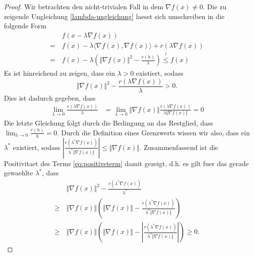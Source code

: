 \begin{proof}
Wir betrachten den nicht-trivialen Fall in dem $\nabla f(x) \neq 0$. 
Die zu zeigende Ungleichung \eqref{lambda-ungleichung} laesst sich umschreiben in die folgende Form
\begin{align*}
&f(x - \lambda \nabla f(x))\\
 = \, &f(x) - \lambda \langle \nabla f(x), \nabla f(x)\rangle + r(\lambda \nabla f(x)) \\
= \, &f(x) - \lambda( \Vert\nabla f(x)\Vert^2 - \frac{r(h)}{\lambda}) \overset{!}{\leq} f(x)
\end{align*}
Es ist hinreichend zu zeigen, dass ein $\lambda>0$ existiert, sodass
\begin{equation}
\label{eq:positiveterm}
\Vert\nabla f(x)\Vert^2 - \frac{r(\lambda \nabla f(x))}{\lambda} >0.
\end{equation}
  Dies ist dadurch gegeben, dass 
\begin{align*}
\lim_{\lambda\to 0} \frac{r(\lambda \nabla f(x))}{\lambda} &= \lim_{\lambda \to 0}\Vert\nabla f(x)\Vert \frac{r(\lambda \nabla f(x))}{\lambda \Vert\nabla f(x)\Vert}= 0
\end{align*}
Die letzte Gleichung folgt durch die Bedingung an das Restglied, dass $\lim_{h\to 0}\frac{r(h)}{h} = 0$. Durch die Definition eines Grenzwerts wissen wir also, dass ein $\lambda^*$ existiert, sodass $\left| \frac{r(\lambda^* \nabla f(x))}{\lambda^* \Vert\nabla f(x)\Vert} \right| \leq \Vert\nabla f(x)\Vert$. Zusammenfassend ist die Positivitaet des Terms \eqref{eq:positiveterm} damit gezeigt, d.h. es gilt fuer das gerade gewaehlte $\lambda^*$, dass
\begin{align*}
&\Vert\nabla f(x)\Vert^2 - \frac{r(\lambda^* \nabla f(x))}{\lambda^*} \\
\geq \, &\Vert\nabla f(x)\Vert \left( \Vert \nabla f(x)\Vert - \frac{r (\lambda^* \nabla f(x))}{\lambda^* \Vert \nabla f(x)\Vert} \right) \\
\geq \, &\Vert \nabla f(x)\Vert \left(\Vert\nabla f(x)\Vert - \left| \frac{r (\lambda^* \nabla f(x))}{\lambda^* \Vert \nabla f(x)\Vert}\right| \right) \geq 0. 
\end{align*}
\end{proof}





